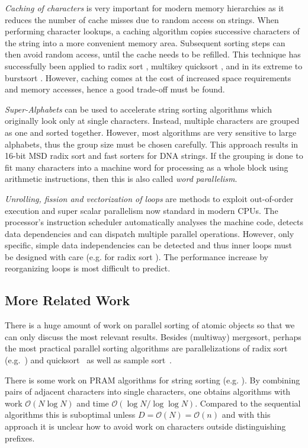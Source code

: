 \documentclass[a4paper]{myjournal}
\newcommand{\Oh}[1]{\mathcal{O}\!\left( #1\right)}
\def\Oh#1{\mathcal{O}(#1)}
\begin{document}
\emph{Caching of characters} is very important for modern memory hierarchies as
it reduces the number of cache misses due to random access on strings.  When
performing character lookups, a caching algorithm copies successive characters
of the string into a more convenient memory area.  Subsequent sorting steps can
then avoid random access, until the cache needs to be refilled.  This technique
has successfully been applied to radix sort \cite{ng2007cache}, multikey
quicksort \cite{rantala2007web}, and in its extreme to burstsort
\cite{sinha2007cache-efficient}. However, caching comes at the cost of increased
space requirements and memory accesses, hence a good trade-off must be found.

\emph{Super-Alphabets} can be used to accelerate string sorting algorithms which
originally look only at single characters.  Instead, multiple characters are
grouped as one and sorted together.  However, most algorithms are very sensitive
to large alphabets, thus the group size must be chosen carefully.  This approach
results in 16-bit MSD radix sort and fast sorters for DNA strings.  If the
grouping is done to fit many characters into a machine word for processing as a
whole block using arithmetic instructions, then this is also called \emph{word
  parallelism}.

\emph{Unrolling, fission and vectorization of loops} are methods to exploit
out-of-order execution and super scalar parallelism now standard in modern CPUs.
The processor's instruction scheduler automatically analyses the machine code,
detects data dependencies and can dispatch multiple parallel operations.
However, only specific, simple data independencies can be detected and thus
inner loops must be designed with care (e.g. for radix sort
\cite{karkkainen2009engineering}). The performance increase by reorganizing
loops is most difficult to predict.

\subsection{More Related Work}

There is a huge amount of work on parallel sorting of atomic objects so that we
can only discuss the most relevant results. Besides (multiway) mergesort,
perhaps the most practical parallel sorting algorithms are parallelizations of
radix sort (e.g.~\cite{wassenberg2011engineering}) and
quicksort~\cite{tsigas2003simple} as well as sample
sort~\cite{blelloch1991comparison}.

There is some work on PRAM algorithms for string sorting
(e.g. \cite{hagerup94optimal}). By combining pairs of adjacent characters into
single characters, one obtains algorithms with work $\Oh{N\log N}$ and time
$\Oh{\log N/\log\log N}$. Compared to the sequential algorithms this is
suboptimal unless $D=\Oh{N}=\Oh{n}$ and with this approach it is unclear how to
avoid work on characters outside distinguishing prefixes.
\end{document}
